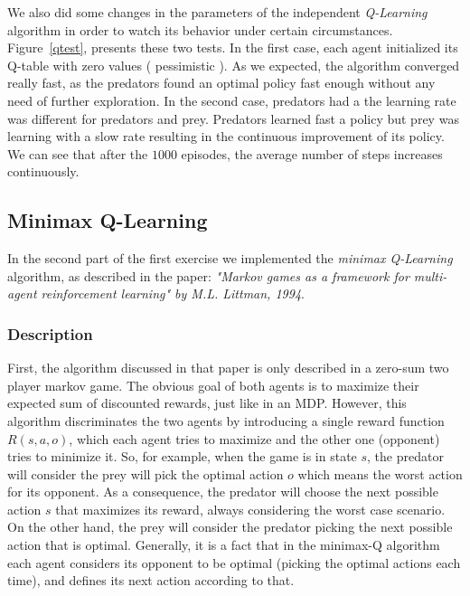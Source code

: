 \documentclass[a4paper,11pt]{article}
\begin{document}
We also did some changes in the parameters of the independent \textit{Q-Learning} algorithm in order to watch its behavior under certain circumstances. Figure~\ref{qtest}, presents these two tests. In the first case, each agent initialized its Q-table with zero values ( pessimistic ). As we expected, the algorithm converged really fast, as the predators found an optimal policy fast enough without any need of further exploration. In the second case, predators had a the learning rate was different for predators and prey. Predators learned fast a policy but prey was learning with a slow rate resulting in the continuous improvement of its policy. We can see that after the $1000$ episodes, the average number of steps increases continuously.


\subsection{Minimax Q-Learning}

In the second part of the first exercise we implemented the \textit{minimax Q-Learning} algorithm, as described in the paper: \textit{"Markov games as a framework for multi-agent reinforcement learning" by M.L. Littman, 1994}.

\subsubsection{Description}
First, the algorithm discussed in that paper is only described in a zero-sum two player markov game. The obvious goal of both agents is to maximize their expected sum of discounted rewards, just like in an MDP. However, this algorithm discriminates the two agents by introducing a single reward function $R(s,a,o)$, which each agent tries to maximize and the other one (opponent) tries to minimize it. So, for example, when the game is in state $s$, the predator will consider the prey will pick the optimal action $o$ which means the worst action for its opponent. As a consequence, the predator will choose the next possible action $s$ that maximizes its reward, always considering the worst case scenario. On the other hand, the prey will consider the predator picking the next possible action that is optimal. Generally, it is a fact that in the minimax-Q algorithm each agent considers its opponent to be optimal (picking the optimal actions each time), and defines its next action according to that. 
\end{document}
